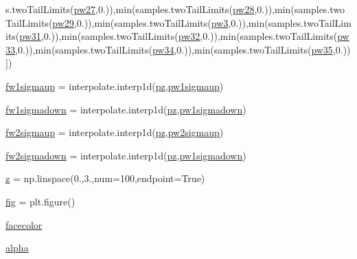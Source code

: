 \begin{DoxyCompactItemize}
s.\+two\+Tail\+Limits(\mbox{\hyperlink{namespacewBDE_a8255676c34cd4e8796aaa4e7dd21c8cf}{pw27}},0.)),min(samples.\+two\+Tail\+Limits(\mbox{\hyperlink{namespacewBDE_a8f86eb9ba19e66919b0727141cf4f01b}{pw28}},0.)),min(samples.\+two\+Tail\+Limits(\mbox{\hyperlink{namespacewBDE_a6a36336925bbc0472e3b3b20efce6b2b}{pw29}},0.)),min(samples.\+two\+Tail\+Limits(\mbox{\hyperlink{namespacewBDE_a61a816ef4edab1168d773e576d5e1321}{pw3}},0.)),min(samples.\+two\+Tail\+Limits(\mbox{\hyperlink{namespacewBDE_a46201594a81c5e3eef97e0786f166d87}{pw31}},0.)),min(samples.\+two\+Tail\+Limits(\mbox{\hyperlink{namespacewBDE_aa2c7cf8e2b74816c2f92e4e4be25840c}{pw32}},0.)),min(samples.\+two\+Tail\+Limits(\mbox{\hyperlink{namespacewBDE_a1c44a143c96f2bf9ec07050d9b49a747}{pw33}},0.)),min(samples.\+two\+Tail\+Limits(\mbox{\hyperlink{namespacewBDE_a66b08b6bf6c9b97a79c1948e00acbe10}{pw34}},0.)),min(samples.\+two\+Tail\+Limits(\mbox{\hyperlink{namespacewBDE_a3d2638469853dcc57314cb3c96c37c44}{pw35}},0.))\mbox{]})
\item 
\mbox{\hyperlink{namespacewBDE_a9e29853d91ccfcadd2ee3adedf093858}{fw1sigmaup}} = interpolate.\+interp1d(\mbox{\hyperlink{namespacewBDE_a0718e21a1de05ef96e74436fa9610ddf}{pz}},\mbox{\hyperlink{namespacewBDE_a1ad3fbd7fad6fdbcfa61026acd763030}{pw1sigmaup}})
\item 
\mbox{\hyperlink{namespacewBDE_a6b56585bd857a484be9a6a92270b6749}{fw1sigmadown}} = interpolate.\+interp1d(\mbox{\hyperlink{namespacewBDE_a0718e21a1de05ef96e74436fa9610ddf}{pz}},\mbox{\hyperlink{namespacewBDE_adb9fc411d3d9a34889b4e17a31d5356c}{pw1sigmadown}})
\item 
\mbox{\hyperlink{namespacewBDE_a293cc9d17f959a9ab5f50e8515276b98}{fw2sigmaup}} = interpolate.\+interp1d(\mbox{\hyperlink{namespacewBDE_a0718e21a1de05ef96e74436fa9610ddf}{pz}},\mbox{\hyperlink{namespacewBDE_aef74e2ce221efa787815988ee03d82e8}{pw2sigmaup}})
\item 
\mbox{\hyperlink{namespacewBDE_aa3e56c7252d60d49b306a822120790cf}{fw2sigmadown}} = interpolate.\+interp1d(\mbox{\hyperlink{namespacewBDE_a0718e21a1de05ef96e74436fa9610ddf}{pz}},\mbox{\hyperlink{namespacewBDE_adb9fc411d3d9a34889b4e17a31d5356c}{pw1sigmadown}})
\item 
\mbox{\hyperlink{namespacewBDE_a3d15e9460ee2d4f60060c201c3fc9a92}{z}} = np.\+linspace(0.,3.,num=100,endpoint=True)
\item 
\mbox{\hyperlink{namespacewBDE_a3abcaea08c112b508fd1e90b5a573ae7}{fig}} = plt.\+figure()
\item 
\mbox{\hyperlink{namespacewBDE_ad8645b12dbf25bca65c34ddca75d8877}{facecolor}}
\item 
\mbox{\hyperlink{namespacewBDE_abeedaeb8026c84a97fe18a534920353d}{alpha}}
\end{DoxyCompactItemize}


